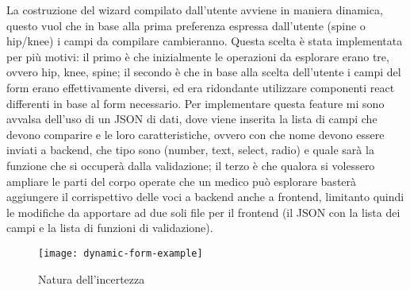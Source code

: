 La costruzione del wizard compilato dall'utente avviene in maniera dinamica, questo vuol che in base alla prima preferenza espressa dall'utente (spine o hip/knee) i campi da compilare cambieranno. Questa scelta è stata implementata per più motivi: il primo è che inizialmente le operazioni da esplorare erano tre, ovvero hip, knee, spine; il secondo è che in base alla scelta dell'utente i campi del form erano effettivamente diversi, ed era ridondante utilizzare componenti react differenti in base al form necessario. Per implementare questa feature mi sono avvalsa dell'uso di un JSON di dati, dove viene inserita la lista di campi che devono comparire e le loro caratteristiche, ovvero con che nome devono essere inviati a backend, che tipo sono (number, text, select, radio) e quale sarà la funzione che si occuperà dalla validazione; il terzo è che qualora si volessero ampliare le parti del corpo operate che un medico può esplorare basterà aggiungere il corrispettivo delle voci a backend anche a frontend, limitanto quindi le modifiche da apportare ad due soli file per il frontend (il JSON con la lista dei campi e la lista di funzioni di validazione). 

\begin{figure}[!ht] 
    \centering 
    \texttt{[image: dynamic-form-example]} 
    \caption{Natura dell'incertezza}
\end{figure}

